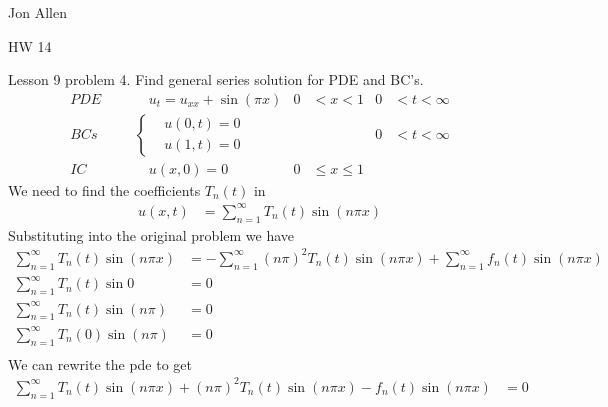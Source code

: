 \documentclass{article}
\begin{document}
Jon Allen

HW 14

Lesson 9 problem 4. Find general series solution for PDE and BC's.
\begin{align*}
  PDE&&&\quad u_t=u_{xx}+\sin(\pi x)&0&<x<1&0&<t<\infty\\
  BCs&&&\left\{
  \begin{aligned}
    &u(0,t)=0\\
    &u(1,t)=0
  \end{aligned}
  \right.&&&0&<t<\infty\\
  IC&&&\quad u(x,0)=0&0&\leq x\leq 1
\end{align*}
We need to find the coefficients $T_n(t)$ in
\begin{align*}
  u(x,t)&=\sum\limits_{n=1}^\infty{T_n(t)\sin(n\pi x)}
\end{align*}
Substituting into the original problem we have
\begin{align*}
  \sum\limits_{n=1}^\infty{T_n(t)\sin(n\pi x)}&=-\sum\limits_{n=1}^\infty{(n\pi)^2T_n(t)\sin(n\pi x)}+\sum\limits_{n=1}^\infty{f_n(t)\sin(n\pi x)}\\
  \sum\limits_{n=1}^\infty{T_n(t)\sin 0}&=0\\
  \sum\limits_{n=1}^\infty{T_n(t)\sin(n\pi)}&=0\\
  \sum\limits_{n=1}^\infty{T_n(0)\sin(n\pi)}&=0\\
\end{align*}
We can rewrite the pde to get
\begin{align*}
  \sum\limits_{n=1}^\infty{T_n(t)\sin(n\pi x)+(n\pi)^2T_n(t)\sin(n\pi x)-f_n(t)\sin(n\pi x)}&=0\\
\end{align*}
\end{document}
